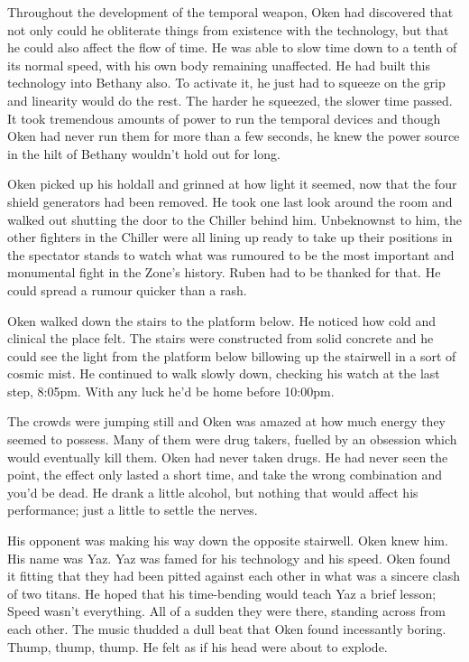 Throughout the development of the temporal weapon, Oken had discovered that not only could he obliterate things from existence with the technology, but that he could also affect the flow of time.  He was able to slow time down to a tenth of its normal speed, with his own body remaining unaffected.  He had built this technology into Bethany also.  To activate it, he just had to squeeze on the grip and linearity would do the rest.  The harder he squeezed, the slower time passed.  It took tremendous amounts of power to run the temporal devices and though Oken had never run them for more than a few seconds, he knew the power source in the hilt of Bethany wouldn't hold out for long.

Oken picked up his holdall and grinned at how light it seemed, now that the four shield generators had been removed.  He took one last look around the room and walked out shutting the door to the Chiller behind him.  Unbeknownst to him, the other fighters in the Chiller were all lining up ready to take up their positions in the spectator stands to watch what was rumoured to be the most important and monumental fight in the Zone's history.  Ruben had to be thanked for that.  He could spread a rumour quicker than a rash.

Oken walked down the stairs to the platform below.  He noticed how cold and clinical the place felt.  The stairs were constructed from solid concrete and he could see the light from the platform below billowing up the stairwell in a sort of cosmic mist.  He continued to walk slowly down, checking his watch at the last step, 8:05pm.  With any luck he'd be home before 10:00pm.  

The crowds were jumping still and Oken was amazed at how much energy they seemed to possess.  Many of them were drug takers, fuelled by an obsession which would eventually kill them.  Oken had never taken drugs.  He had never seen the point, the effect only lasted a short time, and take the wrong combination and you'd be dead.  He drank a little alcohol, but nothing that would affect his performance; just a little to settle the nerves.  

His opponent was making his way down the opposite stairwell.  Oken knew him.  His name was Yaz.  Yaz was famed for his technology and his speed.  Oken found it fitting that they had been pitted against each other in what was a sincere clash of two titans.  He hoped that his time-bending would teach Yaz a brief lesson;  Speed wasn't everything.  All of a sudden they were there, standing across from each other.  The music thudded a dull beat that Oken found incessantly boring.  Thump, thump, thump.  He felt as if his head were about to explode.

